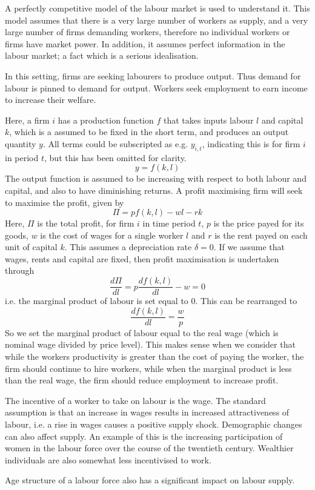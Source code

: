 \documentclass[12pt]{report}
\begin{document}
\begin{flushleft}
A perfectly competitive model of the labour market is used to understand it.
This model assumes that there is a very large number of workers as supply, and
a very large number of firms demanding workers, therefore no individual workers
or firms have market power. In addition, it assumes perfect information in the
labour market; a fact which is a serious idealisation. \par
In this setting, firms are seeking labourers to produce output. Thus demand for
labour is pinned to demand for output. Workers seek employment to earn income 
to increase their welfare. \par
Here, a firm \(i\) has a production function \(f\) that takes inputs labour 
\(l\) and capital \(k\), which is a assumed to be fixed in the short term, and
produces an output quantity \(y\). All terms could be subscripted as e.g. 
\(y_{i, t}\), indicating this is for firm \(i\) in period \(t\), but this has
been omitted for clarity.
\[y = f(k, l)\]
The output function is assumed to be increasing with respect to both labour and
capital, and also to have diminishing returns. A profit maximising firm will 
seek to maximise the profit, given by 
\[\Pi = pf(k, l) - wl - rk\]
Here, \(\Pi\) is the total profit, for firm \(i\) in time period \(t\),
\(p\) is the price payed for its goods, \(w\) is the cost of wages for a single
worker \(l\) and \(r\) is the rent payed on each unit of capital \(k\). This
assumes a depreciation rate \(\delta = 0\). If we assume that wages, rents and
capital are fixed, then profit maximisation is undertaken through
\[\frac{d \Pi}{d l} = p \frac{d f(k, l)}{d l} - w = 0\]
i.e. the marginal product of labour is set equal to \(0\). This can be 
rearranged to
\[\frac{d f(k, l)}{d l} = \frac{w}{p}\]
So we set the marginal product of labour equal to the real wage (which is 
nominal wage divided by price level). This makes sense when we consider that
while the workers productivity is greater than the cost of paying the worker,
the firm should continue to hire workers, while when the marginal product is
less than the real wage, the firm should reduce employment to increase profit. 

\bigskip
The incentive of a worker to take on labour is the wage. The standard 
assumption is that an increase in wages results in increased attractiveness of
labour, i.e. a rise in wages causes a positive supply shock. Demographic 
changes can also affect supply. An example of this is the increasing 
participation of women in the labour force over the course of the twentieth
century. Wealthier individuals are also somewhat less incentivised to work.
\par
Age structure of a labour force also has a significant impact on labour supply.


\end{flushleft}
\end{document}
